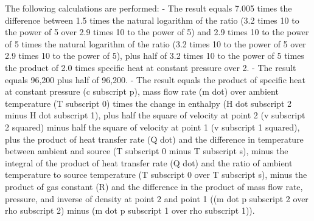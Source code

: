 The following calculations are performed:
- The result equals 7.005 times the difference between 1.5 times the natural logarithm of the ratio (3.2 times 10 to the power of 5 over 2.9 times 10 to the power of 5) and 2.9 times 10 to the power of 5 times the natural logarithm of the ratio (3.2 times 10 to the power of 5 over 2.9 times 10 to the power of 5), plus half of 3.2 times 10 to the power of 5 times the product of 2.0 times specific heat at constant pressure over 2.
- The result equals 96,200 plus half of 96,200.
- The result equals the product of specific heat at constant pressure (c subscript p), mass flow rate (m dot) over ambient temperature (T subscript 0) times the change in enthalpy (H dot subscript 2 minus H dot subscript 1), plus half the square of velocity at point 2 (v subscript 2 squared) minus half the square of velocity at point 1 (v subscript 1 squared), plus the product of heat transfer rate (Q dot) and the difference in temperature between ambient and source (T subscript 0 minus T subscript s), minus the integral of the product of heat transfer rate (Q dot) and the ratio of ambient temperature to source temperature (T subscript 0 over T subscript s), minus the product of gas constant (R) and the difference in the product of mass flow rate, pressure, and inverse of density at point 2 and point 1 ((m dot p subscript 2 over rho subscript 2) minus (m dot p subscript 1 over rho subscript 1)).